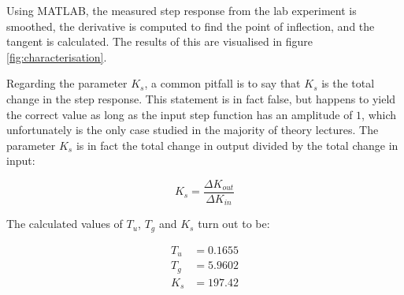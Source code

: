 Using  MATLAB, the measured step response from the lab experiment is smoothed,
the derivative is computed to find the point of inflection, and the tangent is
calculated.   The    results    of    this    are    visualised    in   figure
\ref{fig:characterisation}.

Regarding the parameter $K_s$, a common pitfall is to  say  that  $K_s$ is the
total  change in the step response. This  statement  is  in  fact  false,  but
happens to yield the correct value as long as the input step  function  has an
amplitude of $1$, which unfortunately is the only case studied in the majority
of theory lectures. The parameter $K_s$ is in fact the total change in  output
divided by the total change in input:

\begin{equation}
    K_s = \frac{\Delta K_{out}}{\Delta K_{in}}
\end{equation}

The calculated values of $T_u$, $T_g$ and $K_s$ turn out to be:

\begin{align*}
    T_u &= 0.1655 \\
    T_g &= 5.9602 \\
    K_s &= 197.42
\end{align*}

